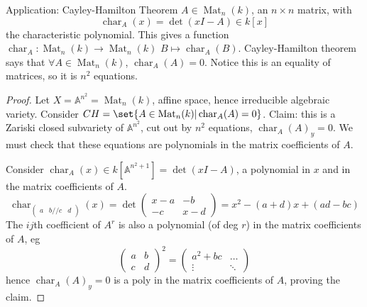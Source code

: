 \documentclass{article}
\newcommand{\A}{\mathbb{A}}
\DeclareMathOperator{\Mat}{Mat}
\DeclareMathOperator{\chara}{char}
\begin{document}
Application: Cayley-Hamilton Theorem
$A \in \Mat_n(k)$, an $n \times n$ matrix, with
\begin{equation*}
    \chara_A(x) = \det(x I - A) \in k[x]
\end{equation*}
the characteristic polynomial.
This gives a function $\chara_A: \Mat_n(k) \to \Mat_n(k)$ $B \mapsto \chara_A(B)$.
Cayley-Hamilton theorem says that $\forall A \in \Mat_n(k)$, $\chara_A(A) = 0$. Notice this is an equality of matrices, so it is $n^2$ equations.
\begin{proof}
    Let $X = \A^{n^2} = \Mat_n(k)$, affine space, hence irreducible algebraic variety.
    Consider $CH = \set{A \in \Mat_n(k) | \chara_A(A) = 0}$.
    Claim: this is a Zariski closed subvariety of $\A^{n^2}$, cut out by $n^2$ equations, $\chara_A(A)_y = 0$.
    We must check that these equations are polynomials in the matrix coefficients of $A$.


    Consider $\chara_A(x) \in k[\A^{n^2 + 1}] = \det(xI - A)$, a polynomial in $x$ and in the matrix coefficients of $A$.
    \begin{equation*}
    \chara_{\begin{pmatrix}a & b//c&d\end{pmatrix}}(x) = \det
        \begin{pmatrix}
            x-a & -b \\ -c & x-d
        \end{pmatrix}
        =x^2  -(a+d) x + (ad - bc)
    \end{equation*}
    The $ij$th coefficient of $A^r$ is also a polynomial (of deg $r$) in the matrix coefficients of $A$, eg
    \begin{equation*}
        \begin{pmatrix}
            a & b \\ c & d
        \end{pmatrix}^2 =
        \begin{pmatrix}
            a^2 + bc & \dots \\
            \vdots & \ddots
        \end{pmatrix}
    \end{equation*}
    hence $\chara_A(A)_y=0$ is a poly in the matrix coefficients of $A$, proving the claim.


\end{proof}
\end{document}
